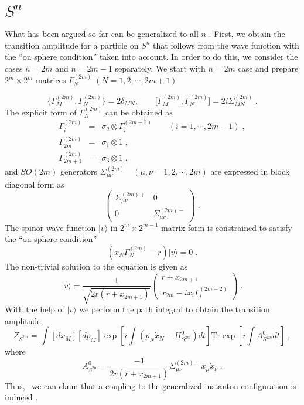 \documentclass[12pt,a4paper]{article}
\begin{document}
\section{$S^{n}$}

\bigskip What has been argued so far can be generalized to all $n$ . First,
we obtain the transition amplitude for a particle on $S^{n}$ that follows
from the wave function with the ``on sphere condition'' taken into account.
In order to do this, we consider the cases $n=2m$ and $n=2m-1$ separately.
We start with $n=2m$ case and prepare $2^{m}\times 2^{m}$ matrices $\Gamma
_{N}^{(2m)}\;\left( N=1,2,\cdots ,2m+1\right) $

\begin{equation}
\{\Gamma _{M}^{(2m)},\Gamma _{N}^{(2m)}\}=2\delta _{MN},\qquad \lbrack
\Gamma _{M}^{(2m)},\Gamma _{N}^{(2m)}]=2i\Sigma _{MN}^{(2m)}\;.
\end{equation}
The explicit form of $\Gamma _{N}^{(2m)}$ can be obtained as 
\begin{eqnarray}
\Gamma _{i}^{(2m)} &=&\sigma _{2}\otimes \Gamma _{i}^{(2m-2)}\qquad
(i=1,\cdots ,2m-1)\;,  \nonumber \\
\Gamma _{2m}^{(2m)} &=&\sigma _{1}\otimes 1\;, \\
\Gamma _{2m+1}^{(2m)} &=&\sigma _{3}\otimes 1\;,  \nonumber
\end{eqnarray}
and $SO(2m)$ generators $\Sigma _{\mu \nu }^{(2m)}\quad (\mu ,\nu
=1,2,\cdots ,2m)$ are expressed in block diagonal form as 
\begin{equation}
\left( 
\begin{array}{cc}
\Sigma _{\mu \nu }^{(2m)+} & 0 \\ 
0 & \Sigma _{\mu \nu }^{(2m)-}
\end{array}
\right) \;.
\end{equation}
The spinor wave function $|v\rangle $ in $2^{m}\times 2^{m-1}$ matrix form
is constrained to satisfy the ``on sphere condition'' 
\begin{equation}
(x_{N}\Gamma _{N}^{(2m)}-r)|v\rangle =0\;.
\end{equation}
The non-trivial solution to the equation is given as 
\begin{equation}
|v\rangle ={\frac{1}{\sqrt{2r(r+x_{2m+1})}}}\left( 
\begin{array}{c}
r+x_{2m+1} \\ 
x_{2m}-ix_{i}\Gamma _{i}^{(2m-2)}
\end{array}
\right) \;.
\end{equation}
With the help of $|v\rangle $ we perform the path integral to obtain the
transition amplitude, 
\begin{equation}
Z_{S^{2m}}=\int [dx_{M}][dp_{M}]\exp \left[ i\int (p_{N}\dot{x}%
_{N}-H_{S^{2m}}^{0})dt\right] \mathrm{Tr}\exp \left[ i\int A_{S^{2m}}^{0}dt%
\right] \;,  \label{zs2m}
\end{equation}
where 
\begin{equation}
A_{S^{2m}}^{0}={\frac{-1}{2r(r+x_{2m+1})}}\Sigma _{\mu \nu }^{(2m)+}x_{\mu }%
\dot{x}_{\nu }\;.
\end{equation}
Thus, \ we can claim that a coupling to the generalized instanton
configuration is induced \cite{Fujii:1995wn}.
\end{document}
